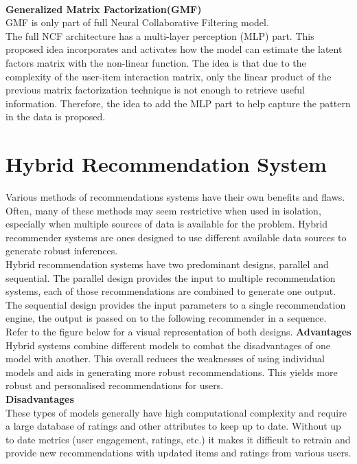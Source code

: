 \\\textbf{Generalized Matrix Factorization(GMF)}
 \\GMF is only part of full Neural Collaborative Filtering model.
 \\The full NCF architecture has a multi-layer perception (MLP) part. This proposed idea incorporates and activates how the model can estimate the latent factors matrix with the non-linear function. The idea is that due to the complexity of the user-item interaction matrix, only the linear product of the previous matrix factorization technique is not enough to retrieve useful information. Therefore, the idea to add the MLP part to help capture the pattern in the data is proposed.

\section{Hybrid Recommendation System}
Various methods of recommendations systems have their own benefits and flaws. Often, many of these methods may seem restrictive when used in isolation, especially when multiple sources of data is available for the problem. Hybrid recommender systems are ones designed to use different available data sources to generate robust inferences.
\\Hybrid recommendation systems have two predominant designs, parallel and sequential. The parallel design provides the input to multiple recommendation systems, each of those recommendations are combined to generate one output. 
The sequential design provides the input parameters to a single recommendation engine, the output is passed on to the following recommender in a sequence. Refer to the figure below for a visual representation of both designs.
\textbf{Advantages}
\\Hybrid systems combine different models to combat the disadvantages of one model with another. This overall reduces the weaknesses of using individual models and aids in generating more robust recommendations. This yields more robust and personalised recommendations for users.
\\\textbf{Disadvantages}
\\These types of models generally have high computational complexity and require a large database of ratings and other attributes to keep up to date. 
Without up to date metrics (user engagement, ratings, etc.) it makes it difficult to retrain and provide new recommendations with updated items and ratings from various users.

